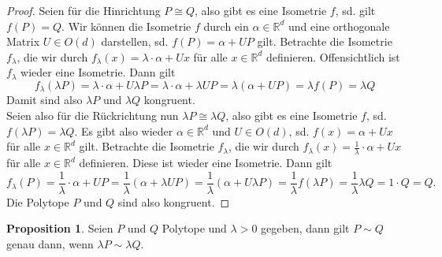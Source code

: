 \documentclass[11pt,titlepage]{article}
\newcommand{\setR}{\mathbb{R}}
\theoremstyle{definition}
\newtheorem{proposition}[theorem]{Proposition}
\theoremstyle{remark}
\begin{document}
	\begin{proof}
		Seien für die Hinrichtung $P\cong Q$, also gibt es eine Isometrie 
		$f$, sd. gilt $f(P)=Q$. Wir können die Isometrie $f$ durch ein $\alpha\in
		\setR^d$ und eine orthogonale Matrix $U\in O(d)$ darstellen, sd. 
		$f(P)=\alpha + UP$ gilt. Betrachte die Isometrie $f_{\lambda}$, die wir 
		durch $f_{\lambda}(x)=\lambda\cdot \alpha +Ux$ für alle $x\in\setR^d$ definieren. 
		Offensichtlich ist $f_{\lambda}$ wieder eine Isometrie. 
		Dann gilt
		\[f_{\lambda}(\lambda P)=\lambda\cdot \alpha+U \lambda P =\lambda\cdot 
		\alpha+\lambda U P =\lambda(\alpha+ U P)=\lambda f(P)=\lambda Q\]
		Damit sind also $\lambda P$ und $\lambda Q$ kongruent. \\
		Seien also für die Rückrichtung nun $\lambda P\cong \lambda Q$, also 
		gibt es eine Isometrie $f$, sd. $f(\lambda P)=\lambda Q$. Es gibt 
		also wieder $\alpha\in\setR^d$ und $U\in O(d)$, sd. 
		$f(x)=\alpha + Ux$ für alle $x\in\setR^d$ gilt. Betrachte die Isometrie 
		$f_{\lambda}$, die wir durch 
		$f_{\lambda}(x)=\frac{1}{\lambda}\cdot \alpha +U x$ für alle $x\in\setR^d$ 
		definieren. Diese ist wieder eine Isometrie. Dann gilt 
		\[f_{\lambda}(P)=\frac{1}{\lambda}\cdot \alpha +U P 
		=\frac{1}{\lambda}(\alpha+\lambda U P)
		=\frac{1}{\lambda}(\alpha + U \lambda P)
		=\frac{1}{\lambda} f(\lambda P)=\frac{1}{\lambda} \lambda Q =1\cdot Q=Q.\]
		Die Polytope $P$ und $Q$ sind also kongruent.
	\end{proof}
	
	\begin{proposition} \label{prop:dilzerl}
		Seien $P$ und $Q$ Polytope und $\lambda>0$ gegeben, dann gilt 
		$P\sim Q$ genau dann, wenn $\lambda P\sim \lambda Q$.
	\end{proposition}
	
\end{document}
